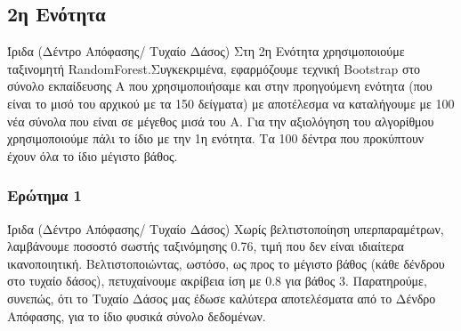 \documentclass{beamer}
\begin{document}
\subsection{2η Ενότητα}
\begin{frame}{Ίριδα (Δέντρο Απόφασης/ Τυχαίο Δάσος)}
    Στη 2η Ενότητα χρησιμοποιούμε ταξινομητή  RandomForest.Συγκεκριμένα, εφαρμόζουμε τεχνική  Bootstrap   στο σύνολο εκπαίδευσης Α που χρησιμοποιήσαμε και στην προηγούμενη ενότητα (που είναι το μισό του αρχικού με τα 150 δείγματα) με αποτέλεσμα να καταλήγουμε με 100 νέα σύνολα που είναι σε μέγεθος μισά του Α. Για την αξιολόγηση του αλγορίθμου χρησιμοποιούμε πάλι το ίδιο με την 1η ενότητα. Τα 100 δέντρα που προκύπτουν έχουν όλα το ίδιο μέγιστο βάθος.
\end{frame}

\subsubsection{Ερώτημα 1}
\begin{frame}{Ίριδα (Δέντρο Απόφασης/ Τυχαίο Δάσος)}
    Χωρίς βελτιστοποίηση υπερπαραμέτρων, λαμβάνουμε ποσοστό σωστής ταξινόμησης 0.76, τιμή που δεν είναι ιδιαίτερα ικανοποιητική. Βελτιστοποιώντας, ωστόσο, ως προς το μέγιστο βάθος (κάθε δένδρου στο τυχαίο δάσος), πετυχαίνουμε ακρίβεια ίση με 0.8 για βάθος 3. Παρατηρούμε, συνεπώς, ότι το Τυχαίο Δάσος μας έδωσε καλύτερα αποτελέσματα από το Δένδρο Απόφασης, για το ίδιο φυσικά σύνολο δεδομένων.
\end{frame}
\end{document}
